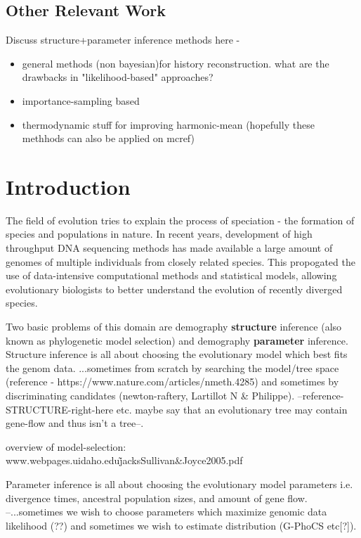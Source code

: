 \documentclass[11pt]{article}
\newcommand{\1}{\mathbbm{1}}
\begin{document}
\subsection{Other Relevant Work}

Discuss structure+parameter inference methods here - 

\begin{itemize}
\item general methods (non bayesian)for history reconstruction. what are the drawbacks in "likelihood-based" approaches?

\item importance-sampling based

\item thermodynamic stuff for improving harmonic-mean (hopefully these methhods can also be applied on mcref)

\end{itemize}

\section{Introduction}


The field of evolution tries to explain the process of speciation - the formation of species and populations in nature. In recent years,  development of high throughput DNA sequencing methods has made available a large amount of genomes of multiple individuals from closely related species. This propogated the use of data-intensive computational methods and statistical models, allowing evolutionary biologists to better understand the evolution of recently diverged species.

Two basic problems of this domain are demography \textbf{structure} inference (also known as phylogenetic model selection) and demography \textbf{parameter} inference. 
Structure inference is all about choosing the evolutionary model which best fits the genom data. ...sometimes from scratch by searching the model/tree space (reference - https://www.nature.com/articles/nmeth.4285) and sometimes by discriminating candidates (newton-raftery, Lartillot N \& Philippe). --reference-STRUCTURE-right-here etc. maybe say that an evolutionary tree may contain gene-flow and thus isn't a tree--.

overview of model-selection: www.webpages.uidaho.edu\/\~jacks\/Sullivan\&Joyce2005.pdf


Parameter inference is all about choosing the evolutionary model parameters i.e. divergence times, ancestral population sizes, and amount of gene flow. --...sometimes we wish to choose parameters which maximize genomic data likelihood (??) and sometimes we wish to estimate distribution (G-PhoCS etc[?]). 
\end{document}
